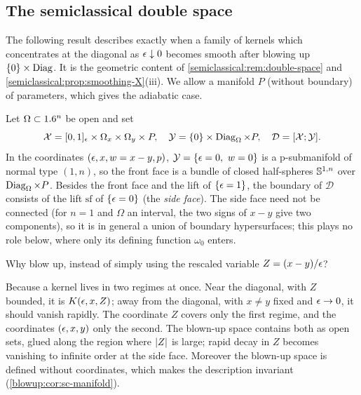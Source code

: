 \subsection{The semiclassical double space}
The following result describes exactly when a family of kernels which concentrates at
the diagonal as $\epsilon\downarrow0$ becomes smooth after blowing up $\{0\}\times\operatorname{Diag}$. It is
the geometric content of \cref{semiclassical:rem:double-space} and
\cref{semiclassical:prop:smoothing-X}(iii). We allow a manifold $P$ (without boundary)
of parameters, which gives the adiabatic case.

Let $\Omega\subset1.6^n$ be open and set
\begin{equation*}
  \mathcal X=[0,1]_\epsilon\times\Omega_x\times\Omega_y\times P,\quad
  \mathcal Y=\{0\}\times\operatorname{Diag}_\Omega\times P,\quad
  \mathcal D=[\mathcal X;\mathcal Y].
\end{equation*}
In the coordinates $(\epsilon,x,w=x-y,p)$, $\mathcal Y=\{\epsilon=0,\ w=0\}$ is a p-submanifold of
normal type $(1,n)$, so the front face is a bundle of closed half-spheres $\mathbb{S}^{1,n}$
over $\operatorname{Diag}_\Omega\times P$. Besides the front face and the lift of $\{\epsilon=1\}$, the
boundary of $\mathcal D$ consists of the lift $\mathrm{sf}$ of $\{\epsilon=0\}$ (the \emph{side
face}). The side face need not be connected (for $n=1$ and $\Omega$ an interval, the two
signs of $x-y$ give two components), so it is in general a union of boundary
hypersurfaces; this plays no role below, where only its defining function $\omega_0$
enters.

\begin{question}
Why blow up, instead of simply using the rescaled variable $Z=(x-y)/\epsilon$?
\end{question}
\begin{answer}
Because a kernel lives in two regimes at once. Near the diagonal, with $Z$ bounded, it
is $K(\epsilon,x,Z)$; away from the diagonal, with $x\ne y$ fixed and $\epsilon\to0$, it should
vanish rapidly. The coordinate $Z$ covers only the first regime, and the coordinates
$(\epsilon,x,y)$ only the second. The blown-up space contains both as open sets, glued
along the region where $\lvert Z\rvert$ is large; rapid decay in $Z$ becomes vanishing to infinite
order at the side face. Moreover the blown-up space is defined without coordinates, which
makes the description invariant (\cref{blowup:cor:sc-manifold}).
\end{answer}

